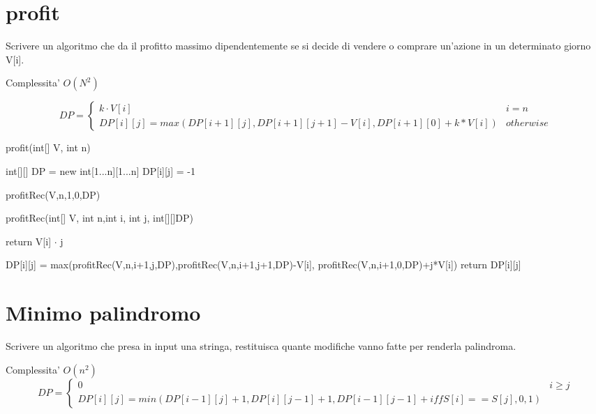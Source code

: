 \documentclass[oneside]{book}
\begin{document}
\section{profit}
Scrivere un algoritmo che da il profitto massimo dipendentemente se si decide di vendere o comprare un'azione in un determinato giorno V[i].

Complessita' $O(N^2)$

\begin{equation}
DP =
	\begin{cases}
		k \cdot V[i] & i = n \\
		DP[i][j] = max(DP[i+1][j], DP[i+1][j+1] - V[i], DP[i+1][0]+k*V[i]) & otherwise
	\end{cases}
\end{equation}

\begin{algorithm}
\caption{profit(int[] V, int n)}
\begin{algorithmic}
\State int[][] DP = new int[1...n][1...n]
		\State DP[i][j] = -1
	\EndFor
\EndFor

profitRec(V,n,1,0,DP)
\end{algorithmic}
\end{algorithm}


\begin{algorithm}
\caption{profitRec(int[] V, int n,int i, int j, int[][]DP)}
\begin{algorithmic}
	return V[i] $\cdot$ j
\EndIf

	\State DP[i][j] = max(profitRec(V,n,i+1,j,DP),profitRec(V,n,i+1,j+1,DP)-V[i], profitRec(V,n,i+1,0,DP)+j*V[i])
\EndIf
return DP[i][j]
\end{algorithmic}
\end{algorithm}
\section{Minimo palindromo}

Scrivere un algoritmo che presa in input una stringa, restituisca quante modifiche vanno fatte per renderla palindroma.

Complessita' $O(n^2)$
\begin{equation}
DP = 
	\begin{cases}
	0 & i \geq j \\
	DP[i][j] = min(DP[i-1][j] + 1, DP[i][j-1]+1, DP[i-1][j-1] + iff{S[i]==S[j],0,1})
	\end{cases}
\end{equation}
\end{document}
